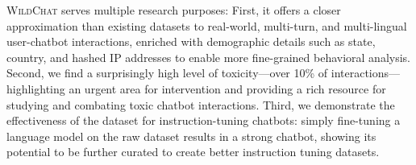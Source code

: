 \documentclass{article} %
\newcommand{\corpus}{\textsc{WildChat}\xspace}
\begin{document}



\corpus serves multiple research purposes: First, it offers a closer approximation than existing datasets to real-world, multi-turn, and multi-lingual user-chatbot interactions, enriched with demographic details such as state, country, and hashed IP addresses to enable more fine-grained behavioral analysis. Second, we find a surprisingly high level of toxicity—over 10\% of interactions—highlighting an urgent area for intervention and providing a rich resource for studying and combating toxic chatbot interactions. Third, we demonstrate the effectiveness of the dataset for instruction-tuning chatbots: simply fine-tuning a language model on the raw dataset results in a strong chatbot, showing its potential to be further curated to create better instruction tuning datasets.
\end{document}
